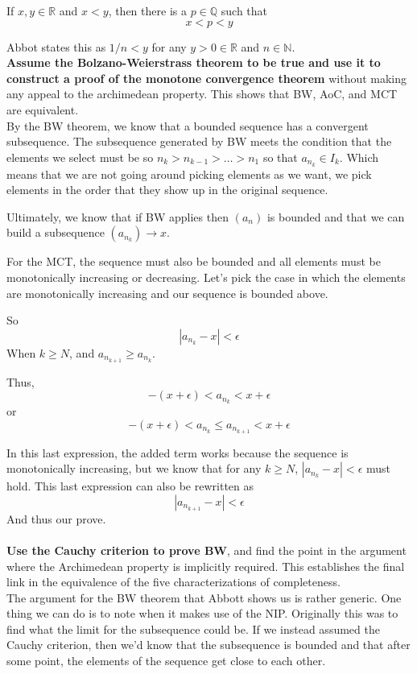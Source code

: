 If $x,y\in\mathbb{R}$ and $x<y$, then there is a $p\in\mathbb{Q}$ such that
$$
x < p < y
$$

Abbot states this as $1/n < y$ for any $y>0 \in\mathbb{R}$ and $n\in\mathbb{N}$.
\\



\textbf{Assume the Bolzano-Weierstrass theorem to be true and use it to construct a proof of the
monotone convergence theorem} without making any appeal to the archimedean property.
This shows that BW, AoC, and MCT are equivalent.
\\

By the BW theorem, we know that a bounded sequence has a convergent subsequence.
The subsequence generated by BW meets the condition that the elements we select
must be so $n_k > n_{k-1} > \ldots > n_1$ so that $a_{n_k}\in I_k$.
Which means that we are not going around picking elements as we want, we pick elements in the order that
they show up in the original sequence.

Ultimately, we know that if BW applies then $(a_n)$ is bounded and that we can build a subsequence
$(a_{n_k}) \rightarrow x$.

For the MCT, the sequence must also be bounded and all elements must be monotonically increasing or decreasing.
Let's pick the case in which the elements are monotonically increasing and our sequence is bounded above.

So
$$
|a_{n_k} - x| < \epsilon
$$
When $k \geq N$, and $a_{n_{k+1}} \geq a_{n_k}$.

Thus,
$$
- (x+\epsilon) < a_{n_k} < x+\epsilon
$$
or
$$
- (x+\epsilon) < a_{n_k} \leq a_{n_{k+1}} < x+\epsilon
$$

In this last expression, the added term works because the sequence is monotonically increasing,
but we know that for any $k\geq N$, $|a_{n_k} - x| < \epsilon$ must hold.
This last expression can also be rewritten as
$$
|a_{n_{k+1}} - x| < \epsilon
$$
And thus our prove.
\\~\\



\textbf{Use the Cauchy criterion to prove BW}, and find the point in the argument where the
Archimedean property is implicitly required.
This establishes the final link in the equivalence of the five characterizations of completeness.
\\

The argument for the BW theorem that Abbott shows us is rather generic.
One thing we can do is to note when it makes use of the NIP.
Originally this was to find what the limit for the subsequence could be.
If we instead assumed the Cauchy criterion, then we'd know that the subsequence is bounded
and that after some point, the elements of the sequence get close to each other.

